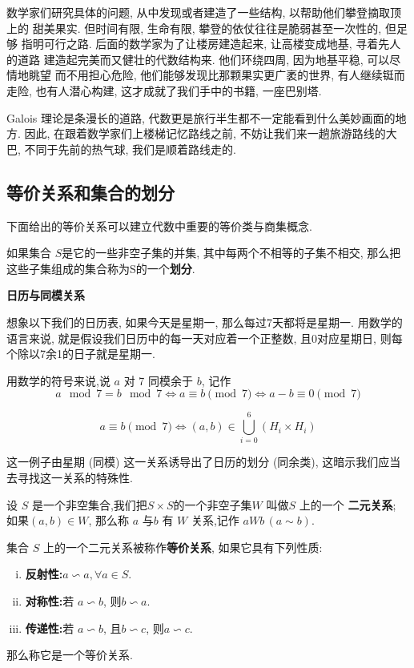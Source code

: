 \documentclass[UTF8]{book}
\begin{document}
数学家们研究具体的问题, 从中发现或者建造了一些结构, 以帮助他们攀登摘取顶上的
甜美果实. 但时间有限, 生命有限, 攀登的依仗往往是脆弱甚至一次性的, 但足够
指明可行之路. 后面的数学家为了让楼房建造起来, 让高楼变成地基, 寻着先人的道路
建造起完美而又健壮的代数结构来. 他们环绕四周, 因为地基平稳, 可以尽情地眺望
而不用担心危险, 他们能够发现比那颗果实更广袤的世界, 有人继续铤而走险, 
也有人潜心构建, 这才成就了我们手中的书籍, 一座巴别塔. 

Galois 理论是条漫长的道路, 代数更是旅行半生都不一定能看到什么美妙画面的地方. 
因此, 在跟着数学家们上楼梯记忆路线之前, 不妨让我们来一趟旅游路线的大巴, 
不同于先前的热气球, 我们是顺着路线走的. 


\subsection{等价关系和集合的划分}

下面给出的等价关系可以建立代数中重要的等价类与商集概念. 

\begin{definition}
    如果集合 $S$是它的一些非空子集的并集, 其中每两个不相等的子集不相交, 
    那么把这些子集组成的集合称为S的一个\textbf{划分}.
\end{definition}

\begin{example}
    \textbf{日历与同模关系}

    想象以下我们的日历表, 如果今天是星期一, 那么每过7天都将是星期一. 
    用数学的语言来说, 就是假设我们日历中的每一天对应着一个正整数, 
    且0对应星期日, 则每个除以7余1的日子就是星期一. 

    用数学的符号来说,说 
    $a$ 对 7 同模余于 $b$, 记作
    $$a \mod 7=b \mod 7 \Leftrightarrow a\equiv b \pmod 7
    \Leftrightarrow a-b \equiv 0 \pmod 7 $$

$$    a\equiv b \pmod 7 \Leftrightarrow (a,b)\in \bigcup_{i=0}^{6}({H_i}\times{H_i})$$
\end{example}

这一例子由星期 (同模) 这一关系诱导出了日历的划分 (同余类), 
这暗示我们应当去寻找这一关系的特殊性. 

\begin{definition}
    设 $S$ 是一个非空集合,我们把$S\times S$的一个非空子集$W$ 叫做$S$ 
    上的一个 \textbf{二元关系}; 
    如果$(a,b)\in W$, 那么称 $a$ 与$b$ 有 $W$ 关系,记作 $aWb\,(a\sim b)$.

    集合 $S$ 上的一个二元关系被称作\textbf{等价关系}, 如果它具有下列性质:
    \begin{enumerate}[i.]
        \item \textbf{反射性:}\quad $a \backsim a,\forall a \in S$.        
        \item \textbf{对称性:}\quad 若 $a \backsim b$, 则$b \backsim a$.
        \item \textbf{传递性:}\quad 若 $a \backsim b$, 且$b \backsim c$, 
        则$a \backsim c$.
    \end{enumerate}
    那么称它是一个等价关系.
\end{definition}
\end{document}
